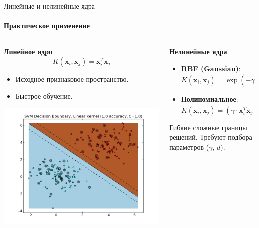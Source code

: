 \documentclass[notheorems, handout]{beamer}
\begin{document}
\begin{frame}{Линейные и нелинейные ядра}
  \framesubtitle{Практическое применение}
  \small

  \begin{columns}
    \begin{column}{0.5\textwidth}
      \textbf{Линейное ядро}
      \vspace{-3mm}
      \[
        K(\mathbf{x}_i, \mathbf{x}_j) = \mathbf{x}_i^T \mathbf{x}_j
      \]
      \vspace{-6mm}
      \begin{itemize}
        \item Исходное признаковое пространство.
        \item Быстрое обучение.
      \end{itemize}
      \includegraphics[width=\textwidth]{img/linear_kernal.jpg}
    \end{column}
    \begin{column}{0.5\textwidth}
      \textbf{Нелинейные ядра}
      \vspace{-3mm}
      \begin{itemize}
        \item \textbf{RBF (Gaussian)}:
          $K(\mathbf{x}_i, \mathbf{x}_j) = \exp(-\gamma
          ||\mathbf{x}_i - \mathbf{x}_j||^2)$
        \item \textbf{Полиномиальное}:
          $K(\mathbf{x}_i, \mathbf{x}_j) = (\gamma \cdot
          \mathbf{x}_i^T \mathbf{x}_j + r)^d$
      \end{itemize}
      Гибкие сложные границы решений. Требуют подбора параметров
      ($\gamma$, $d$).

\end{column}
\end{columns}
\end{frame}
\end{document}
